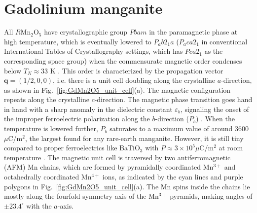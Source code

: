 \section{Gadolinium manganite}
All $R$Mn$_2$O$_5$ have crystallographic group $Pbam$ \cite{Alonso97} in the paramagnetic phase at high temperature, which is eventually lowered to $P_ab2_1a$ ($P_aca2_1$ in conventional International Tables of Crystallography settings, which has $Pca2_1$ as the corresponding space group) when the commensurate magnetic order condenses below $T_{N} \approx 33$ K \cite{Vecchini14,Lee13}.
This order is characterized by the propagation vector $\bm{q} = (1/2, 0, 0)$, i.e. there is a unit cell doubling along the crystalline $a$-direction, as shown in Fig.~\ref{fig:GdMn2O5_unit_cell}(a).
The magnetic configuration repeats along the crystalline $c$-direction. The magnetic phase transition goes hand in hand with a sharp anomaly in the dielectric constant $\varepsilon_b$, signaling the onset of the improper ferroelectric polarization  along the $b$-direction ($P_b$) \cite{Vecchini08,Lee13,Vecchini14}.
When the temperature is lowered further, $P_b$ saturates to a maximum value of around 3600 $\mu$C/m$^2$, the largest found for any rare-earth manganite.
However, it is still tiny compared to proper ferroelectrics like BaTiO$_3$ with $P \approx 3 \times 10^5 \mu $C/m$^2$ at room temperature \cite{Mason1948,VonHippel1950}.
The magnetic unit cell is traversed by two antiferromagnetic (AFM) Mn chains, which are formed by pyramidally coordinated Mn$^{3+}$ and octahedrally coordinated Mn$^{4+}$ ions, as indicated by the cyan lines and purple polygons in Fig.~\ref{fig:GdMn2O5_unit_cell}(a).
The Mn spins inside the chains lie mostly along the fourfold symmetry axis of the Mn$^{3+}$ pyramids, making angles of $\pm 23.4^\circ$ with the $a$-axis.


